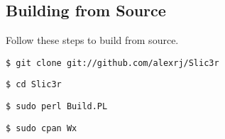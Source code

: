 \subsection{Building from Source}
\label{buildingFromSource}

Follow these steps to build from source.

\texttt{\$ git clone git://github.com/alexrj/Slic3r}

\texttt{\$ cd Slic3r}

\texttt{\$ sudo perl Build.PL}

\texttt{\$ sudo cpan Wx}

